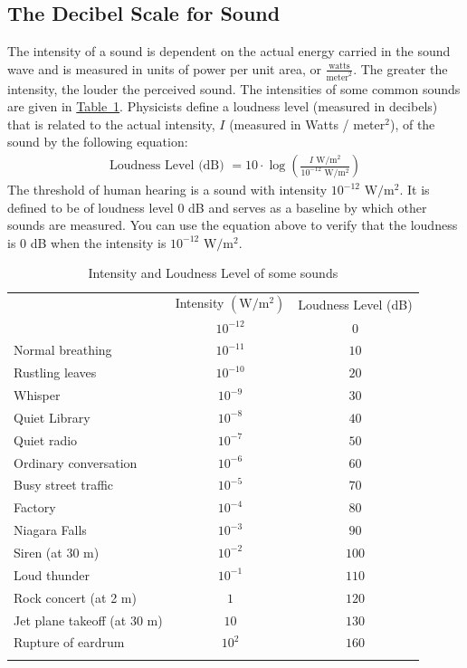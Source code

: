 \documentclass[10pt,]{book}
\theoremstyle{ptxdefinitionnotitle}
\theoremstyle{ptxdefinitiontitle}
\theoremstyle{ptxdefinitionnotitle}
\theoremstyle{ptxdefinitiontitle}
\theoremstyle{ptxdefinitionnotitle}
\theoremstyle{ptxdefinitiontitle}
\numberwithin{equation}{section}
\newcommand{\hrulemedium}{\noalign{\hrule height 0.07em}}
\newcommand{\hrulethick} {\noalign{\hrule height 0.11em}}
\begin{document}
\subsection[{The Decibel Scale for Sound}]{The Decibel Scale for Sound}\label{subsection-1}
\hypertarget{p-309}{}%
The intensity of a sound is dependent on the actual energy carried in the sound wave and is measured in units of power per unit area, or \(\frac{ \text{watts} }{ \text{meter} ^2}\).  The greater the intensity, the louder the perceived sound. The intensities of some common sounds are given in \hyperref[decibel-table]{Table~1}.  Physicists define a loudness level (measured in decibels) that is related to the actual intensity, \(I\) (measured in Watts / meter\(^2\)), of the sound by the following equation:%
\begin{gather*}
\text{Loudness Level (dB) } = 10 \cdot \log \left( \frac{I  \text{ W} / \text{m}^2 } {10^{-12} \text{ W} / \text{m}^2 }  \right)
\end{gather*}
The threshold of human hearing is a sound with intensity \(10^{-12} \text{ W} / \text{m}^2\). It is defined to be of loudness level \(0\) dB and serves as a baseline by which other sounds are measured. You can use the equation above to verify that the loudness is \(0\) dB when the intensity is \(10^{-12} \text{ W} / \text{m}^2\).%
\begin{table}
\centering
\begin{tabular}{ccc}\hrulethick
\multicolumn{1}{l}{Sound}&Intensity \(\left( \text{W} / \text{m}^2 \right)\)&Loudness Level (dB)\tabularnewline\hrulemedium
\multicolumn{1}{l}{Threshold of hearing}&\(10^{-12}\)&\(0\)\tabularnewline[0pt]
\multicolumn{1}{l}{Normal breathing}&\(10^{-11}\)&\(10\)\tabularnewline[0pt]
\multicolumn{1}{l}{Rustling leaves}&\(10^{-10}\)&\(20\)\tabularnewline[0pt]
\multicolumn{1}{l}{Whisper}&\(10^{-9}\)&\(30\)\tabularnewline[0pt]
\multicolumn{1}{l}{Quiet Library}&\(10^{-8}\)&\(40\)\tabularnewline[0pt]
\multicolumn{1}{l}{Quiet radio}&\(10^{-7}\)&\(50\)\tabularnewline[0pt]
\multicolumn{1}{l}{Ordinary conversation}&\(10^{-6}\)&\(60\)\tabularnewline[0pt]
\multicolumn{1}{l}{Busy street traffic}&\(10^{-5}\)&\(70\)\tabularnewline[0pt]
\multicolumn{1}{l}{Factory}&\(10^{-4}\)&\(80\)\tabularnewline[0pt]
\multicolumn{1}{l}{Niagara Falls}&\(10^{-3}\)&\(90\)\tabularnewline[0pt]
\multicolumn{1}{l}{Siren (at 30 m)}&\(10^{-2}\)&\(100\)\tabularnewline[0pt]
\multicolumn{1}{l}{Loud thunder}&\(10^{-1}\)&\(110\)\tabularnewline[0pt]
\multicolumn{1}{l}{Rock concert (at 2 m)}&\(1\)&\(120\)\tabularnewline[0pt]
\multicolumn{1}{l}{Jet plane takeoff (at 30 m)}&\(10\)&\(130\)\tabularnewline[0pt]
\multicolumn{1}{l}{Rupture of eardrum}&\(10^{2}\)&\(160\)\tabularnewline\hrulethick
\end{tabular}
\caption{Intensity and Loudness Level of some sounds\label{decibel-table}}
\end{table}
\end{document}
